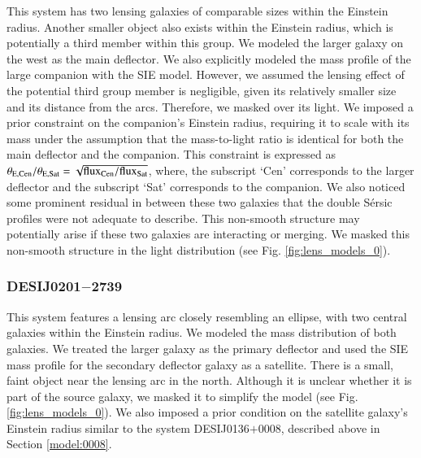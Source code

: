 \documentclass{aa}
\newcommand{\newedit}[1]{{#1}} %
\begin{document}
This system has two lensing galaxies of comparable sizes within the Einstein radius. Another smaller object also exists within the Einstein radius, which is potentially a third member within this group. We modeled the larger galaxy on the west as the main deflector. We also explicitly modeled the mass profile of the large companion with the SIE model. However, we assumed the lensing effect of the potential third group member is negligible, given its relatively smaller size and its distance from the arcs. Therefore, we masked over its light. \newedit{We imposed a prior constraint on the companion's Einstein radius, requiring it to scale with its mass under the assumption that the mass-to-light ratio is identical for both the main deflector and the companion. This constraint is expressed as $\theta_{\rm E, Cen}/\theta_{\rm E, Sat} = \sqrt{{\rm flux_{Cen}}/{\rm flux_{Sat}}}$, where, the subscript `Cen' corresponds to the larger deflector and the subscript `Sat' corresponds to the companion}. We also noticed some prominent residual in between these two galaxies that the double S\'ersic profiles were not adequate to describe. This non-smooth structure may potentially arise if these two galaxies are interacting or merging. We masked this non-smooth structure in the light distribution (see Fig. \ref{fig:lens_models_0}).

\subsubsection{DESIJ0201$-$2739} \label{model:2739}

This system features a lensing arc closely resembling an ellipse, with two central galaxies within the Einstein radius. We modeled the mass distribution of both galaxies. We treated the larger galaxy as the primary deflector and used the SIE mass profile for the secondary deflector \newedit{galaxy as a satellite}. There is a small, faint object near the lensing arc in the north. Although it is unclear whether it is part of the source galaxy, we masked it to simplify the model (see Fig. \ref{fig:lens_models_0}). \newedit{We also imposed a prior condition on the satellite galaxy's Einstein radius similar to the system DESIJ0136$+$0008, described above in Section \ref{model:0008}.}

\end{document}
